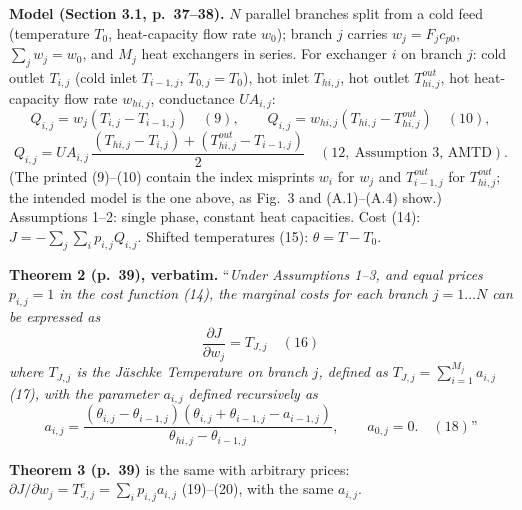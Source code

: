 \documentclass[11pt,a4paper]{report}
\begin{document}
\textbf{Model (Section 3.1, p.~37--38).} \(N\) parallel branches split from a cold feed (temperature \(T_0\),
heat-capacity flow rate \(w_0\)); branch \(j\) carries \(w_j = F_j c_{p0}\), \(\sum_j w_j = w_0\), and \(M_j\) heat
exchangers in series. For exchanger \(i\) on branch \(j\): cold outlet \(T_{i,j}\) (cold inlet \(T_{i-1,j}\),
\(T_{0,j} = T_0\)), hot inlet \(T_{hi,j}\), hot outlet \(T^{out}_{hi,j}\), hot heat-capacity flow rate \(w_{hi,j}\),
conductance \(UA_{i,j}\):
\[Q_{i,j} = w_j (T_{i,j} - T_{i-1,j}) \quad (9), \qquad Q_{i,j} = w_{hi,j}(T_{hi,j} - T^{out}_{hi,j}) \quad (10),\]
\[Q_{i,j} = UA_{i,j}\,\frac{(T_{hi,j} - T_{i,j}) + (T^{out}_{hi,j} - T_{i-1,j})}{2} \quad (12,\ \text{Assumption 3, AMTD}).\]
(The printed (9)--(10) contain the index misprints \(w_i\) for \(w_j\) and \(T^{out}_{i-1,j}\) for \(T^{out}_{hi,j}\);
the intended model is the one above, as Fig.~3 and (A.1)--(A.4) show.) Assumptions 1--2: single phase, constant heat
capacities. Cost (14): \(J = -\sum_j \sum_i p_{i,j} Q_{i,j}\). Shifted temperatures (15): \(\theta = T - T_0\).

\textbf{Theorem 2 (p.~39), verbatim.} ``\emph{Under Assumptions 1--3, and equal prices \(p_{i,j} = 1\) in the cost
function (14), the marginal costs for each branch \(j = 1 \dots N\) can be expressed as}
\[\frac{\partial J}{\partial w_j} = T_{J,j} \quad (16)\]
\emph{where \(T_{J,j}\) is the Jäschke Temperature on branch \(j\), defined as \(T_{J,j} = \sum_{i=1}^{M_j} a_{i,j}\)
(17), with the parameter \(a_{i,j}\) defined recursively as}
\[a_{i,j} = \frac{(\theta_{i,j} - \theta_{i-1,j})(\theta_{i,j} + \theta_{i-1,j} - a_{i-1,j})}{\theta_{hi,j} - \theta_{i-1,j}},
\qquad a_{0,j} = 0. \quad (18)\text{''}\]

\textbf{Theorem 3 (p.~39)} is the same with arbitrary prices: \(\partial J/\partial w_j = T^e_{J,j} = \sum_i p_{i,j}
a_{i,j}\) (19)--(20), with the same \(a_{i,j}\).
\end{document}
